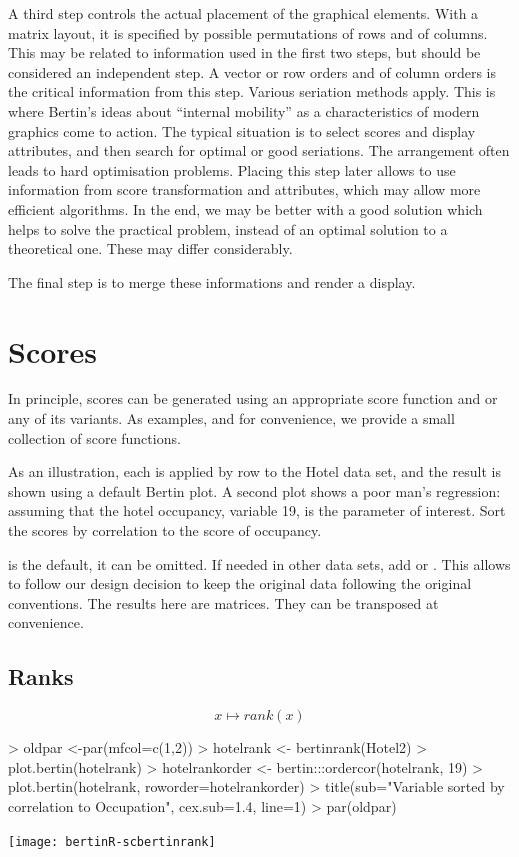 \documentclass[nogin, dvips,12pt,a4paper,twoside]{amsart}
\begin{document}
A third step controls the actual placement of the graphical elements. With a matrix layout, it is specified by possible permutations of rows and of columns. This may be related to information used in the first two steps, but should be considered an independent step. A vector or row orders and of column orders is the critical information from this step. Various seriation methods apply. This is where Bertin's ideas about ``internal mobility''  as a characteristics of modern graphics come to action. The typical situation is to select scores and display attributes, and then search for optimal or good seriations. The arrangement often leads to hard optimisation problems. Placing this step later allows to use information from score transformation and attributes, which may allow more efficient algorithms. In the end, we may be better with a good solution which helps to solve the practical problem, instead of an optimal solution to a theoretical one. These may differ considerably.

The final step is to merge these informations and render a display. 

\section{Scores}

In principle, scores can be generated using an appropriate score function and  or any of its variants. 
As  examples, and for convenience, we provide a small collection of score functions. 

As an illustration, each is applied by row to the Hotel data set, and the result is shown using a default Bertin plot. 
A second plot shows a poor man's regression: assuming that the hotel occupancy, variable 19, is the parameter 
of interest. Sort the scores by correlation to the score of occupancy.

 is the default,  it can be omitted. If needed in other data sets, add 
 or   . This allows to follow our design decision to keep the 
original data following the original conventions. The results here are matrices. They can be transposed at convenience.

\pagebreak
\subsection{Ranks}
 $$
 x \mapsto rank(x)
 $$
\begin{Schunk}
\begin{Sinput}
> oldpar <-par(mfcol=c(1,2))
> hotelrank <- bertinrank(Hotel2)
> plot.bertin(hotelrank)
> hotelrankorder <- bertin:::ordercor(hotelrank, 19)
> plot.bertin(hotelrank, roworder=hotelrankorder)
> title(sub="Variable sorted by correlation to Occupation", cex.sub=1.4, line=1)
> par(oldpar)
\end{Sinput}
\end{Schunk}
\texttt{[image: bertinR-scbertinrank]}
\end{document}
